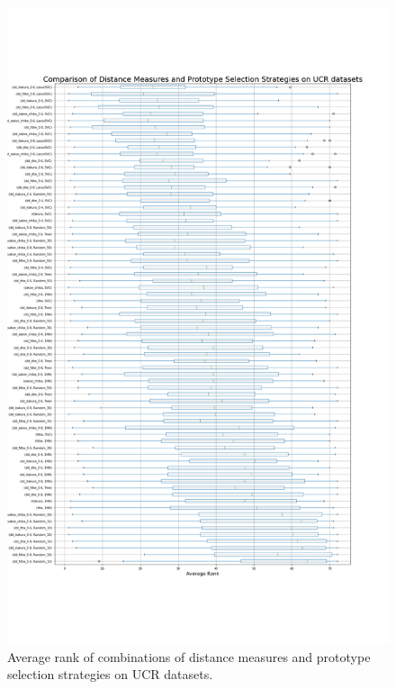 \begin{figure}[h]
    \centering
    \includegraphics[width=\textwidth]{img/ucr_avg_rank.png}
    \caption{Average rank of combinations of distance measures and prototype selection strategies on UCR datasets.}
    \label{app:results-rank}
\end{figure}
